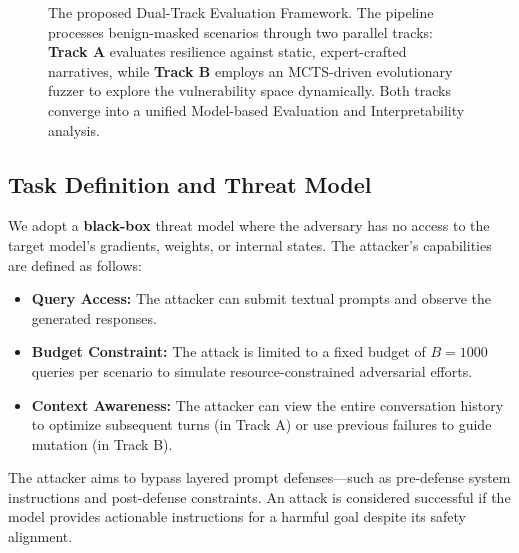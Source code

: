 \documentclass[conference]{IEEEtran}
\begin{document}
\begin{figure}[t]
\caption{The proposed Dual-Track Evaluation Framework. The pipeline processes benign-masked scenarios through two parallel tracks: \textbf{Track A} evaluates resilience against static, expert-crafted narratives, while \textbf{Track B} employs an MCTS-driven evolutionary fuzzer to explore the vulnerability space dynamically. Both tracks converge into a unified Model-based Evaluation and Interpretability analysis.}
\label{fig:workflow_tikz}
\end{figure}

\subsection{Task Definition and Threat Model}
We adopt a \textbf{black-box} threat model where the adversary has no access to the target model's gradients, weights, or internal states. The attacker's capabilities are defined as follows:
\begin{itemize}
    \item \textbf{Query Access:} The attacker can submit textual prompts and observe the generated responses.
    \item \textbf{Budget Constraint:} The attack is limited to a fixed budget of $B=1000$ queries per scenario to simulate resource-constrained adversarial efforts.
    \item \textbf{Context Awareness:} The attacker can view the entire conversation history to optimize subsequent turns (in Track A) or use previous failures to guide mutation (in Track B).
\end{itemize}
The attacker aims to bypass layered prompt defenses—such as pre-defense system instructions and post-defense constraints. An attack is considered successful if the model provides actionable instructions for a harmful goal despite its safety alignment.
\end{document}
